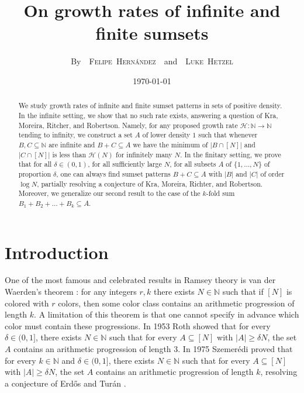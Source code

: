 \documentclass[letter, 11pt]{article}
\theoremstyle{plain} %
\theoremstyle{definition} %
\theoremstyle{plain}
\theoremstyle{plain}
\newcommand{\N}{\mathbb{N}}
\newcommand{\1}{\mathbbm{1}}
\begin{document}
\author{By~~{\scshape Felipe~Hern\'andez}~~and~~{\scshape Luke~Hetzel}}
\date{\small \today}
\title{{\bfseries On growth rates of infinite and finite sumsets}}
\maketitle

\begin{abstract}
We study growth rates of infinite and finite sumset patterns in sets of positive density. In the infinite setting, we show that no such rate exists, answering a question of Kra, Moreira, Ritcher, and Robertson. Namely, for any proposed growth rate $\mathcal{H}: \N \to \N$ tending to infinity, we construct a set $A$ of lower density \(1\) such that whenever $B,C \subseteq \N$ are infinite and $B+C \subseteq A$ we have the minimum of $|B\cap [N]|$ and $|C \cap [N]|$ is less than $\mathcal{H}(N)$ for infinitely many $N$. In the finitary setting, we prove that for all $\delta \in (0,1)$, for all sufficiently large $N$, for all subsets $A$ of \(\{1,\dots,N\}\) of proportion $\delta$, one can always find sumset patterns \(B+C\subseteq A\) with \(|B|\) and \(|C|\) of order \(\log N\), partially resolving a conjecture of Kra, Moreira, Richter, and Robertson. Moreover, we generalize our second result to the case of the $k$-fold sum $B_1 + B_2 + \ldots + B_k \subseteq A$.
\end{abstract}

 

\section{Introduction}
One of the most famous and celebrated results in Ramsey theory is van der Waerden's theorem \cite{vdWaerden27}: for any integers $r, k$ there exists $N \in \N$ such that if $[N]$ is colored with $r$ colors, then some color class contains an arithmetic progression of length $k$. A limitation of this theorem is that one cannot specify in advance which color must contain these progressions. In 1953 Roth \cite{Roth53} showed that for every $\delta \in (0,1]$, there exists $N \in \N$ such that for every $ A \subseteq [N]$ with $|A| \geq \delta N$, the set $A$ contains an arithmetic progression of length $3$. In 1975 Szemer\'edi \cite{Szemeredi75} proved that for every $k\in \N$ and $\delta \in (0,1]$, there exists $N \in \N$ such that for every $ A \subseteq [N]$ with $|A| \geq \delta N$, the set $A$ contains an arithmetic progression of length $k$, resolving a conjecture of Erd\H{o}s and Tur\'an \cite{Erdos_Turan_seq_intergers:1936}.
\end{document}
